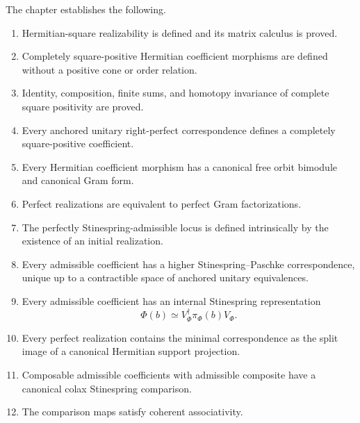 \begin{theorem}
\label{thm:higher-stinespring-logical-summary}
The chapter establishes the following.

\begin{enumerate}
  \item Hermitian-square realizability is defined and its matrix calculus is
  proved.

  \item Completely square-positive Hermitian coefficient morphisms are
  defined without a positive cone or order relation.

  \item Identity, composition, finite sums, and homotopy invariance of
  complete square positivity are proved.

  \item Every anchored unitary right-perfect correspondence defines a
  completely square-positive coefficient.

  \item Every Hermitian coefficient morphism has a canonical free orbit
  bimodule and canonical Gram form.

  \item Perfect realizations are equivalent to perfect Gram factorizations.

  \item The perfectly Stinespring-admissible locus is defined intrinsically by
  the existence of an initial realization.

  \item Every admissible coefficient has a higher Stinespring--Paschke
  correspondence, unique up to a contractible space of anchored unitary
  equivalences.

  \item Every admissible coefficient has an internal Stinespring
  representation
  \[
    \Phi(b)
    \simeq
    V_\Phi^\dagger\pi_\Phi(b)V_\Phi.
  \]

  \item Every perfect realization contains the minimal correspondence as the
  split image of a canonical Hermitian support projection.

  \item Composable admissible coefficients with admissible composite have a
  canonical colax Stinespring comparison.

  \item The comparison maps satisfy coherent associativity.


\end{enumerate}
\end{theorem}
